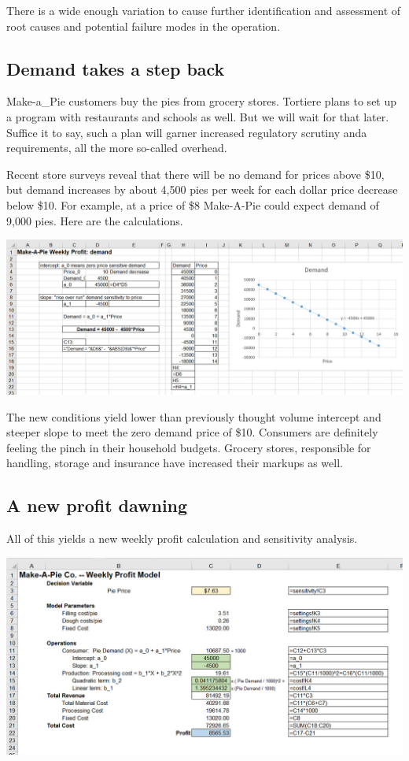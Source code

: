 \documentclass[
]{book}
\begin{document}
There is a wide enough variation to cause further identification and assessment of root causes and potential failure modes in the operation.

\hypertarget{demand-takes-a-step-back}{%
\subsection{Demand takes a step back}\label{demand-takes-a-step-back}}

Make-a\_Pie customers buy the pies from grocery stores. Tortiere plans to set up a program with restaurants and schools as well. But we will wait for that later. Suffice it to say, such a plan will garner increased regulatory scrutiny anda requirements, all the more so-called overhead.

Recent store surveys reveal that there will be no demand for prices above \$10, but demand increases by about 4,500 pies per week for each dollar price decrease below \$10. For example, at a price of \$8 Make-A-Pie could expect demand of 9,000 pies. Here are the calculations.

\includegraphics{images/02/pie-demand-curve.jpg}

The new conditions yield lower than previously thought volume intercept and steeper slope to meet the zero demand price of \$10. Consumers are definitely feeling the pinch in their household budgets. Grocery stores, responsible for handling, storage and insurance have increased their markups as well.

\hypertarget{a-new-profit-dawning}{%
\subsection{A new profit dawning}\label{a-new-profit-dawning}}

All of this yields a new weekly profit calculation and sensitivity analysis.

\includegraphics{images/02/pie-profit-calc.jpg}
\end{document}
